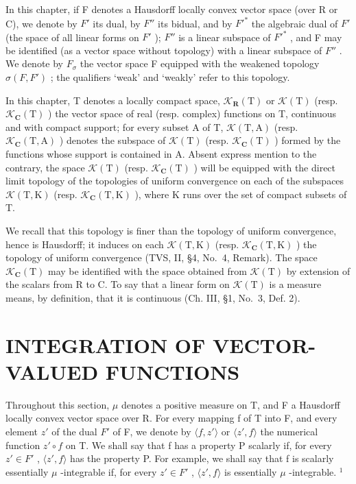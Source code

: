 In this chapter, if F denotes a Hausdorff locally convex vector space (over R or C), we denote by \(F'\) its dual, by \(F''\) its bidual, and by \(F'^*\) the algebraic dual of \(F'\) (the space of all linear forms on \(F'\) ); \(F''\) is a linear subspace of \(F'^*\) , and F may be identified (as a vector space without topology) with a linear subspace of \(F''\) . We denote by \(F_\sigma\) the vector space F equipped with the weakened topology \(\sigma(F, F')\) ; the qualifiers `weak' and `weakly' refer to this topology.

In this chapter, T denotes a locally compact space, \(\mathcal{K}_{\mathbf{R}}(\mathrm{T})\) or \(\mathcal{K}(\mathrm{T})\) (resp. \(\mathcal{K}_{\mathbf{C}}(\mathrm{T})\) ) the vector space of real (resp. complex) functions on T, continuous and with compact support; for every subset A of T, \(\mathcal{K}(\mathrm{T},\mathrm{A})\) (resp. \(\mathcal{K}_{\mathbf{C}}(\mathrm{T},\mathrm{A})\) ) denotes the subspace of \(\mathcal{K}(\mathrm{T})\) (resp. \(\mathcal{K}_{\mathbf{C}}(\mathrm{T})\) ) formed by the functions whose support is contained in A. Absent express mention to the contrary, the space \(\mathcal{K}(\mathrm{T})\) (resp. \(\mathcal{K}_{\mathbf{C}}(\mathrm{T})\) ) will be equipped with the direct limit topology of the topologies of uniform convergence on each of the subspaces \(\mathcal{K}(\mathrm{T},\mathrm{K})\) (resp. \(\mathcal{K}_{\mathbf{C}}(\mathrm{T},\mathrm{K})\) ), where K runs over the set of compact subsets of T.

We recall that this topology is finer than the topology of uniform convergence, hence is Hausdorff; it induces on each \(\mathcal{K}(\mathrm{T},\mathrm{K})\) (resp. \(\mathcal{K}_{\mathbf{C}}(\mathrm{T},\mathrm{K})\) ) the topology of uniform convergence (TVS, II, §4, No.~4, Remark). The space \(\mathcal{K}_{\mathbf{C}}(\mathrm{T})\) may be identified with the space obtained from \(\mathcal{K}(\mathrm{T})\) by extension of the scalars from R to C. To say that a linear form on \(\mathcal{K}(\mathrm{T})\) is a measure means, by definition, that it is continuous (Ch. III, §1, No.~3, Def. 2).

\section{INTEGRATION OF VECTOR-VALUED FUNCTIONS}

Throughout this section, \(\mu\) denotes a positive measure on T, and F a Hausdorff locally convex vector space over R. For every mapping f of T into F, and every element \(z'\) of the dual \(F'\) of F, we denote by \(\langle f, z' \rangle\) or \(\langle z', f \rangle\) the numerical function \(z' \circ f\) on T. We shall say that f has a property P scalarly if, for every \(z' \in F'\) , \(\langle z', f \rangle\) has the property P. For example, we shall say that f is scalarly essentially \(\mu\) -integrable if, for every \(z' \in F'\) , \(\langle z', f \rangle\) is essentially \(\mu\) -integrable. \(^{1}\)

